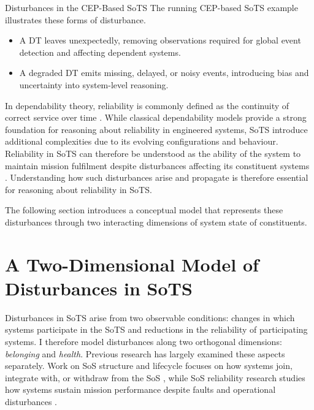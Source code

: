 \begin{runningexample}{Disturbances in the CEP-Based SoTS}
The running CEP-based SoTS example illustrates these forms of disturbance.

\begin{center}

\end{center}
\begin{itemize}[noitemsep]
    \item A DT leaves unexpectedly, removing observations required for global event detection and affecting dependent systems.
    \item A degraded DT emits missing, delayed, or noisy events, introducing bias and uncertainty into system-level reasoning.
\end{itemize}
\end{runningexample}

In dependability theory, reliability is commonly defined as the continuity of correct service over time \cite{avizienis2004basic}. While classical dependability models provide a strong foundation for reasoning about reliability in engineered systems, SoTS introduce additional complexities due to its evolving configurations and behaviour. Reliability in SoTS can therefore be understood as the ability of the system to maintain mission fulfilment despite disturbances affecting its constituent systems \cite{ferreira2023towards}. Understanding how such disturbances arise and propagate is therefore essential for reasoning about reliability in SoTS.

The following section introduces a conceptual model that represents these disturbances through two interacting dimensions of system state of constituents.

\section{A Two-Dimensional Model of Disturbances in SoTS}\label{sec:two-dimensional-disturbances}

Disturbances in SoTS arise from two observable conditions: changes in which systems participate in the SoTS and reductions in the reliability of participating systems. I therefore model disturbances along two orthogonal dimensions: \emph{belonging} and \emph{health}. Previous research has largely examined these aspects separately. Work on SoS structure and lifecycle focuses on how systems join, integrate with, or withdraw from the SoS \cite{axelsson2019refined,svenson2020situation,hristozov2023modeling}, while SoS reliability research studies how systems sustain mission performance despite faults and operational disturbances \cite{ferreira2024framework,uday2015designing,garro2014reliability,li2025reliability}.

